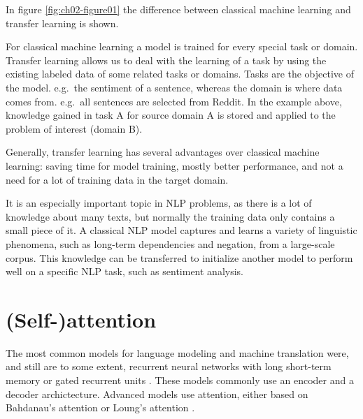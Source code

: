 \documentclass[]{krantz}
\begin{document}
In figure \ref{fig:ch02-figure01} the difference between classical machine learning and transfer learning is shown.

For classical machine learning a model is trained for every special task or domain.
Transfer learning allows us to deal with the learning of a task by using the existing labeled data of some related tasks or domains. Tasks are the objective of the model. e.g.~the sentiment of a sentence, whereas the domain is where data comes from. e.g.~all sentences are selected from Reddit. In the example above, knowledge gained in task A for source domain A is stored and applied to the problem of interest (domain B).

Generally, transfer learning has several advantages over classical machine learning: saving time for model training, mostly better performance, and not a need for a lot of training data in the target domain.

It is an especially important topic in NLP problems, as there is a lot of knowledge about many texts, but normally the training data only contains a small piece of it. A classical NLP model captures and learns a variety of linguistic phenomena, such as long-term dependencies and negation, from a large-scale corpus. This knowledge can be transferred to initialize another model to perform well on a specific NLP task, such as sentiment analysis. \citep{evolutiontransferlearning}

\hypertarget{self-attention}{%
\section{(Self-)attention}\label{self-attention}}

The most common models for language modeling and machine translation were, and still are to some extent, recurrent neural networks with long short-term memory \citep{hochreiter1997long} or gated recurrent units \citep{gru}. These models commonly use an encoder and a decoder archictecture. Advanced models use attention, either based on Bahdanau's attention \citep{bahdanau2014neural} or Loung's attention \citep{luong2015effective}.
\end{document}
